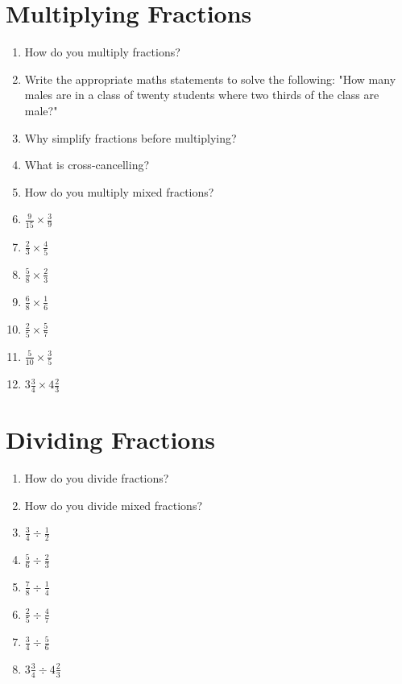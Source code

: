 \documentclass{article}
\begin{document}
\section*{Multiplying Fractions}

\begin{enumerate}
    \item How do you multiply fractions?
    \item Write the appropriate maths statements to solve the following: "How many males are in a class of twenty students where two thirds of the class are male?"
    \item Why simplify fractions before multiplying?
    \item What is cross-cancelling?
    \item How do you multiply mixed fractions?

    \item $\frac{9}{15} \times \frac{3}{9}$
    \item $\frac{2}{3} \times \frac{4}{5}$
    \item $\frac{5}{8} \times \frac{2}{3}$
    \item $\frac{6}{8} \times \frac{1}{6}$
    \item $\frac{2}{5} \times \frac{5}{7}$
    \item $\frac{5}{10} \times \frac{3}{5}$
    \item $3\frac{3}{4} \times 4\frac{2}{3}$
\end{enumerate}

\section*{Dividing Fractions}

\begin{enumerate}
    \item How do you divide fractions?
    \item How do you divide mixed fractions?
    
    \item $\frac{3}{4} \div \frac{1}{2}$
    \item $\frac{5}{6} \div \frac{2}{3}$
    \item $\frac{7}{8} \div \frac{1}{4}$
    \item $\frac{2}{5} \div \frac{4}{7}$
    \item $\frac{3}{4} \div \frac{5}{6}$
    \item $3\frac{3}{4} \div 4\frac{2}{3}$
\end{enumerate}
\end{document}

